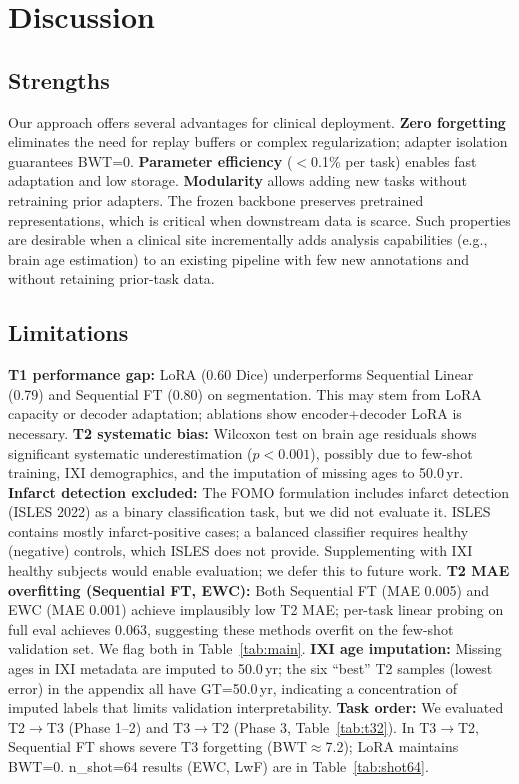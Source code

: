 \section{Discussion}
\label{sec:discussion}

\subsection{Strengths}
\label{sec:strengths}

Our approach offers several advantages for clinical deployment. \textbf{Zero forgetting} eliminates the need for replay buffers or complex regularization; adapter isolation guarantees BWT=0. \textbf{Parameter efficiency} ($<$0.1\% per task) enables fast adaptation and low storage. \textbf{Modularity} allows adding new tasks without retraining prior adapters. The frozen backbone preserves pretrained representations, which is critical when downstream data is scarce. Such properties are desirable when a clinical site incrementally adds analysis capabilities (e.g., brain age estimation) to an existing pipeline with few new annotations and without retaining prior-task data.

\subsection{Limitations}
\label{sec:limitations}

\textbf{T1 performance gap:} LoRA (0.60 Dice) underperforms Sequential Linear (0.79) and Sequential FT (0.80) on segmentation. This may stem from LoRA capacity or decoder adaptation; ablations show encoder+decoder LoRA is necessary. \textbf{T2 systematic bias:} Wilcoxon test on brain age residuals shows significant systematic underestimation ($p<0.001$), possibly due to few-shot training, IXI demographics, and the imputation of missing ages to 50.0\,yr. \textbf{Infarct detection excluded:} The FOMO formulation includes infarct detection (ISLES 2022) as a binary classification task, but we did not evaluate it. ISLES contains mostly infarct-positive cases; a balanced classifier requires healthy (negative) controls, which ISLES does not provide. Supplementing with IXI healthy subjects would enable evaluation; we defer this to future work. \textbf{T2 MAE overfitting (Sequential FT, EWC):} Both Sequential FT (MAE 0.005) and EWC (MAE 0.001) achieve implausibly low T2 MAE; per-task linear probing on full eval achieves 0.063, suggesting these methods overfit on the few-shot validation set. We flag both in Table~\ref{tab:main}. \textbf{IXI age imputation:} Missing ages in IXI metadata are imputed to 50.0\,yr; the six ``best'' T2 samples (lowest error) in the appendix all have GT=50.0\,yr, indicating a concentration of imputed labels that limits validation interpretability. \textbf{Task order:} We evaluated T2$\to$T3 (Phase 1--2) and T3$\to$T2 (Phase 3, Table~\ref{tab:t32}). In T3$\to$T2, Sequential FT shows severe T3 forgetting (BWT$\approx$7.2); LoRA maintains BWT=0. n\_shot=64 results (EWC, LwF) are in Table~\ref{tab:shot64}.

